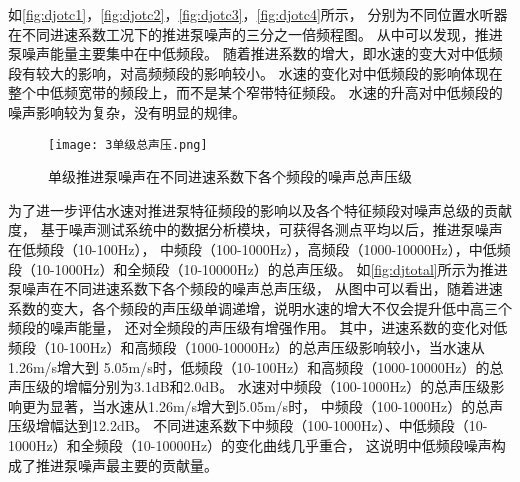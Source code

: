 如\autoref{fig:djotc1}，\autoref{fig:djotc2}，\autoref{fig:djotc3}，\autoref{fig:djotc4}所示，
分别为不同位置水听器在不同进速系数工况下的推进泵噪声的三分之一倍频程图。
从中可以发现，推进泵噪声能量主要集中在中低频段。
随着推进系数的增大，即水速的变大对中低频段有较大的影响，对高频频段的影响较小。
水速的变化对中低频段的影响体现在整个中低频宽带的频段上，而不是某个窄带特征频段。
水速的升高对中低频段的噪声影响较为复杂，没有明显的规律。
\begin{comment}
\begin{figure}[htbp]
        \centering
        \subfigure[pic1.]{
        \texttt{[image: 3dj2\_otc.png]}
        }
\end{figure}
\addtocounter{figure}{-1}
\begin{figure}[htbp]
        \centering
        \addtocounter{figure}{1} 
        \subfigure[pic2.]{
        \texttt{[image: 3dj7\_otc.png]}
        }
\end{figure}
\addtocounter{figure}{-1}
\begin{figure}[htbp]
        \centering
        \addtocounter{figure}{1} 
        \vspace{0.02cm}
        \subfigure[pic2.]{
        \texttt{[image: 3dj6\_otc.png]}
        }
\end{figure}
\addtocounter{figure}{-1}
\begin{figure}[htbp]
        \centering
        \addtocounter{figure}{1} 
        \vspace{0.02cm}
        \subfigure[pic2.]{
        \texttt{[image: 3dj3\_otc.png]}
        }
        \caption{\label{fig:dj_modle}不同进速系数下单级推进泵水下噪声三分之一倍频程图}
\end{figure}
\end{comment}
\begin{figure}[htbp]
    \centering
    \texttt{[image: 3单级总声压.png]}
    \caption{\label{fig:djtotal}单级推进泵噪声在不同进速系数下各个频段的噪声总声压级}
\end{figure}

为了进一步评估水速对推进泵特征频段的影响以及各个特征频段对噪声总级的贡献度，
基于噪声测试系统中的数据分析模块，可获得各测点平均以后，推进泵噪声在低频段（10-100Hz），
中频段（100-1000Hz），高频段（1000-10000Hz），中低频段（10-1000Hz）和全频段（10-10000Hz）的总声压级。
如\autoref{fig:djtotal}所示为推进泵噪声在不同进速系数下各个频段的噪声总声压级，
从图中可以看出，随着进速系数的变大，各个频段的声压级单调递增，说明水速的增大不仅会提升低中高三个频段的噪声能量，
还对全频段的声压级有增强作用。
其中，进速系数的变化对低频段（10-100Hz）和高频段（1000-10000Hz）的总声压级影响较小，当水速从1.26m/s增大到
5.05m/s时，低频段（10-100Hz）和高频段（1000-10000Hz）的总声压级的增幅分别为3.1dB和2.0dB。
水速对中频段（100-1000Hz）的总声压级影响更为显著，当水速从1.26m/s增大到5.05m/s时，
中频段（100-1000Hz）的总声压级增幅达到12.2dB。
不同进速系数下中频段（100-1000Hz）、中低频段（10-1000Hz）和全频段（10-10000Hz）的变化曲线几乎重合，
这说明中低频段噪声构成了推进泵噪声最主要的贡献量。

